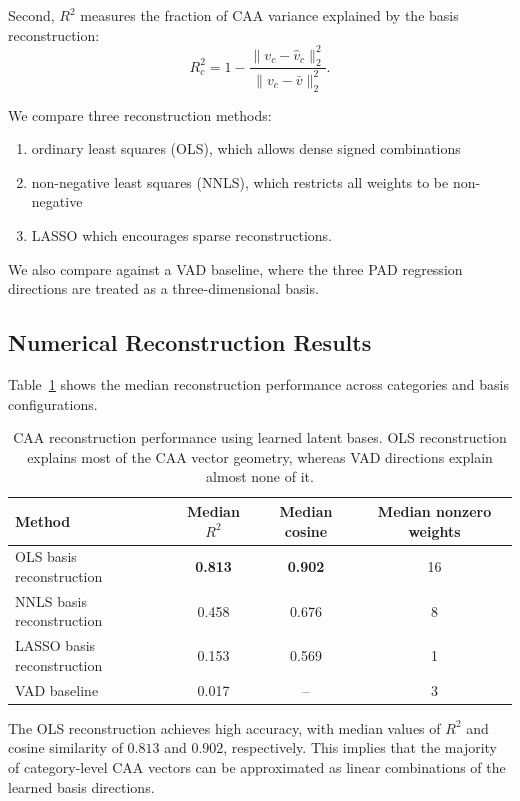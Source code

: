 \documentclass[12pt,twoside]{report}
\begin{document}
Second, $R^2$ measures the fraction of CAA variance explained by the basis reconstruction:
\begin{equation}
R^2_c
=
1 -
\frac{
\|v_c-\hat v_c\|_2^2
}{
\|v_c-\bar v\|_2^2
}.
\end{equation}

We compare three reconstruction methods:
\begin{enumerate}
    \item ordinary least squares (OLS), which allows dense signed combinations
    \item non-negative least squares (NNLS), which restricts all weights to be non-negative
    \item LASSO which encourages sparse reconstructions.
\end{enumerate}

We also compare against a VAD baseline, where the three PAD regression directions are treated as a three-dimensional basis.

\subsection{Numerical Reconstruction Results}

Table~\ref{tab:caa-basis-reconstruction} shows the median reconstruction performance across categories and basis configurations.

\begin{table}[H]
\centering
\begin{tabular}{lccc}
\toprule
Method & Median $R^2$ & Median cosine & Median nonzero weights \\
\midrule
OLS basis reconstruction & \textbf{0.813} & \textbf{0.902} & 16 \\
NNLS basis reconstruction & 0.458 & 0.676 & 8 \\
LASSO basis reconstruction & 0.153 & 0.569 & 1 \\
VAD baseline & 0.017 & -- & 3 \\
\bottomrule
\end{tabular}
\caption{
CAA reconstruction performance using learned latent bases. OLS
reconstruction explains most of the CAA vector geometry,  whereas VAD directions explain almost none of it.
}
\label{tab:caa-basis-reconstruction}
\end{table}

The OLS reconstruction achieves high accuracy, with median values of $R^2$ and cosine similarity of $0.813$ and $0.902$, respectively. This implies that the majority of category-level CAA vectors can be approximated as linear combinations of the learned basis directions.
\end{document}
